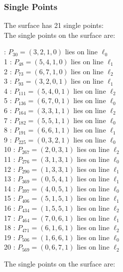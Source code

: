 \documentclass{article}
\begin{document}
{\subsubsection*{Single Points}
The surface has 21 single points:\\
The single points on the surface are:\\
\begin{multicols}{2}
 : $P_{30}=( 3, 2, 1, 0 )$ lies on line $\ell_{0}$\\
1 : $P_{48}=( 5, 4, 1, 0 )$ lies on line $\ell_{1}$\\
2 : $P_{73}=( 6, 7, 1, 0 )$ lies on line $\ell_{2}$\\
3 : $P_{93}=( 3, 2, 0, 1 )$ lies on line $\ell_{1}$\\
4 : $P_{111}=( 5, 4, 0, 1 )$ lies on line $\ell_{2}$\\
5 : $P_{136}=( 6, 7, 0, 1 )$ lies on line $\ell_{0}$\\
6 : $P_{164}=( 3, 3, 1, 1 )$ lies on line $\ell_{2}$\\
7 : $P_{182}=( 5, 5, 1, 1 )$ lies on line $\ell_{0}$\\
8 : $P_{191}=( 6, 6, 1, 1 )$ lies on line $\ell_{1}$\\
9 : $P_{225}=( 0, 3, 2, 1 )$ lies on line $\ell_{0}$\\
10 : $P_{267}=( 2, 0, 3, 1 )$ lies on line $\ell_{2}$\\
11 : $P_{276}=( 3, 1, 3, 1 )$ lies on line $\ell_{0}$\\
12 : $P_{290}=( 1, 3, 3, 1 )$ lies on line $\ell_{1}$\\
13 : $P_{369}=( 0, 5, 4, 1 )$ lies on line $\ell_{1}$\\
14 : $P_{397}=( 4, 0, 5, 1 )$ lies on line $\ell_{0}$\\
15 : $P_{406}=( 5, 1, 5, 1 )$ lies on line $\ell_{1}$\\
16 : $P_{434}=( 1, 5, 5, 1 )$ lies on line $\ell_{2}$\\
17 : $P_{464}=( 7, 0, 6, 1 )$ lies on line $\ell_{1}$\\
18 : $P_{471}=( 6, 1, 6, 1 )$ lies on line $\ell_{2}$\\
19 : $P_{506}=( 1, 6, 6, 1 )$ lies on line $\ell_{0}$\\
20 : $P_{569}=( 0, 6, 7, 1 )$ lies on line $\ell_{2}$\\
\end{multicols}
The single points on the surface are:\\
}
\end{document}

